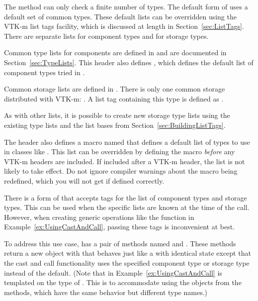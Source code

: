 The  method can only check a finite number of types.
The default form of  uses a default set of common
types. These default lists can be overridden using the VTK-m list tags
facility, which is discussed at length in Section~\ref{sec:ListTags}. There
are separate lists for component types and for storage types.

Common type lists for components are defined in
 and are documented in
Section~\ref{sec:TypeLists}. This header also defines
, which defines the default list
of component types tried in .


Common storage lists are defined in
. There is only one common storage
distributed with VTK-m: . A list tag
containing this type is defined as .

As with other lists, it is possible to create new storage type lists
using the existing type lists and the list bases from
Section~\ref{sec:BuildingListTags}.

The  header also defines a macro
named  that defines a
default list of types to use in classes like
. This list can be overridden by
defining the  macro
\emph{before} any VTK-m headers are included. If included after a VTK-m
header, the list is not likely to take effect. Do not ignore compiler
warnings about the macro being redefined, which you will not get if defined
correctly.


There is a form of  that accepts tags for the list of
component types and storage types. This can be used when the specific
lists are known at the time of the call. However, when creating generic
operations like the  function in
Example~\ref{ex:UsingCastAndCall}, passing these tags is inconvenient at
best.

To address this use case,  has a pair of
methods named  and
. These methods return a new object with that
behaves just like a  with identical
state except that the cast and call functionality uses the specified
component type or storage type instead of the default. (Note that
 in Example~\ref{ex:UsingCastAndCall} is
templated on the type of . This is to
accommodate using the objects from the  methods, which
have the same behavior but different type names.)

